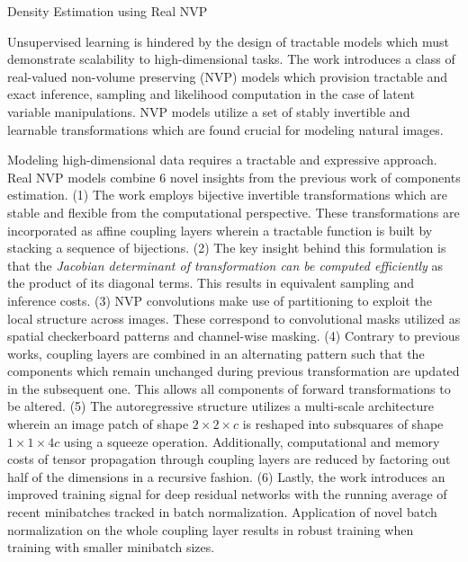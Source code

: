 \documentclass[11pt,letterpaper]{article}
\begin{document}
\begin{center}
  \large{Density Estimation using Real NVP
  }
\end{center}

Unsupervised learning is hindered by the design of tractable models which must demonstrate scalability to high-dimensional tasks. The work introduces a class of real-valued non-volume preserving (NVP) models which provision tractable and exact inference, sampling and likelihood computation in the case of latent variable manipulations. NVP models utilize a set of stably invertible and learnable transformations which are found crucial for modeling natural images.

Modeling high-dimensional data requires a tractable and expressive approach. Real NVP models combine 6 novel insights from the previous work of components estimation. (1) The work employs bijective invertible transformations which are stable and flexible from the computational perspective. These transformations are incorporated as affine coupling layers wherein a tractable function is built by stacking a sequence of bijections. (2) The key insight behind this formulation is that the \textit{Jacobian determinant of transformation can be computed efficiently} as the product of its diagonal terms. This results in equivalent sampling and inference costs. (3) NVP convolutions make use of partitioning to exploit the local structure across images. These correspond to convolutional masks utilized as spatial checkerboard patterns and channel-wise masking. (4) Contrary to previous works, coupling layers are combined in an alternating pattern such that the components which remain unchanged during previous transformation are updated in the subsequent one. This allows all components of forward transformations to be altered. (5) The autoregressive structure utilizes a multi-scale architecture wherein an image patch of shape $2 \times 2 \times c$ is reshaped into subsquares of shape $1 \times 1 \times 4c$ using a squeeze operation. Additionally, computational and memory costs of tensor propagation through coupling layers are reduced by factoring out half of the dimensions in a recursive fashion. (6) Lastly, the work introduces an improved training signal for deep residual networks with the running average of recent minibatches tracked in batch normalization. Application of novel batch normalization on the whole coupling layer results in robust training when training with smaller minibatch sizes. 
\end{document}
